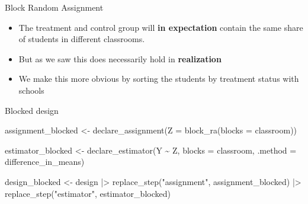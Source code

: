 \documentclass[
  11pt,
  ignorenonframetext,
]{beamer}
\newenvironment{Shaded}{\begin{snugshade}}{\end{snugshade}}
\newcommand{\AttributeTok}[1]{\textcolor[rgb]{0.40,0.45,0.13}{#1}}
\newcommand{\FunctionTok}[1]{\textcolor[rgb]{0.28,0.35,0.67}{#1}}
\newcommand{\NormalTok}[1]{\textcolor[rgb]{0.00,0.23,0.31}{#1}}
\newcommand{\OtherTok}[1]{\textcolor[rgb]{0.00,0.23,0.31}{#1}}
\newcommand{\SpecialCharTok}[1]{\textcolor[rgb]{0.37,0.37,0.37}{#1}}
\newcommand{\StringTok}[1]{\textcolor[rgb]{0.13,0.47,0.30}{#1}}
\providecommand{\tightlist}{%
  \setlength{\itemsep}{0pt}\setlength{\parskip}{0pt}}\usepackage{longtable,booktabs,array}
\begin{document}
\begin{frame}{Block Random Assignment \label{blockedAss}}
\protect\hypertarget{block-random-assignment}{}
\begin{itemize}
\tightlist
\item
  The treatment and control group will \textbf{in expectation} contain
  the same share of students in different classrooms.
\item
  But as we saw this does necessarily hold in \textbf{realization}
\item
  We make this more obvious by sorting the students by treatment status
  with schools
\end{itemize}
\end{frame}

\begin{frame}[fragile]{Blocked design}
\protect\hypertarget{blocked-design}{}
\begin{Shaded}
\begin{Highlighting}[]
\NormalTok{assignment\_blocked }\OtherTok{\textless{}{-}}   
  \FunctionTok{declare\_assignment}\NormalTok{(}\AttributeTok{Z =} \FunctionTok{block\_ra}\NormalTok{(}\AttributeTok{blocks =}\NormalTok{ classroom))  }

\NormalTok{estimator\_blocked }\OtherTok{\textless{}{-}} 
  \FunctionTok{declare\_estimator}\NormalTok{(Y }\SpecialCharTok{\textasciitilde{}}\NormalTok{ Z, }\AttributeTok{blocks =}\NormalTok{ classroom, }
                    \AttributeTok{.method =}\NormalTok{ difference\_in\_means)  }

\NormalTok{design\_blocked }\OtherTok{\textless{}{-}} 
\NormalTok{  design }\SpecialCharTok{|\textgreater{}} 
  \FunctionTok{replace\_step}\NormalTok{(}\StringTok{"assignment"}\NormalTok{, assignment\_blocked) }\SpecialCharTok{|\textgreater{}}
  \FunctionTok{replace\_step}\NormalTok{(}\StringTok{"estimator"}\NormalTok{, estimator\_blocked)}
\end{Highlighting}
\end{Shaded}
\end{frame}
\end{document}
